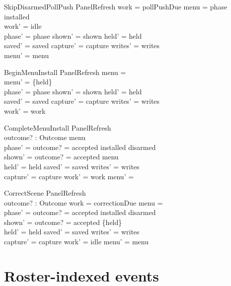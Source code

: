 \documentclass[a4paper,10pt,fleqn]{article}
\begin{document}
\begin{schema}{SkipDisarmedPollPush}
  \Delta PanelRefresh
\where
  work = pollPushDue \land menu = \emptyset \land phase \neq installed \\
  work' = idle \\
  phase' = phase \land shown' = shown \land held' = held \\
  saved' = saved \land capture' = capture \land writes' = writes \\
  menu' = menu
\end{schema}

\begin{schema}{BeginMenuInstall}
  \Delta PanelRefresh
\where
  menu = \emptyset \\
  menu' = \{held\} \\
  phase' = phase \land shown' = shown \land held' = held \\
  saved' = saved \land capture' = capture \land writes' = writes \\
  work' = work
\end{schema}

\begin{schema}{CompleteMenuInstall}
  \Delta PanelRefresh \\
  outcome? : Outcome
\where
  menu \neq \emptyset \\
  phase' = \IF outcome? = accepted \THEN installed \ELSE disarmed \\
  shown' = \IF outcome? = accepted \THEN menu \ELSE \emptyset \\
  held' = held \land saved' = saved \land writes' = writes \\
  capture' = capture \land work' = work \land menu' = \emptyset
\end{schema}

\begin{schema}{CorrectScene}
  \Delta PanelRefresh \\
  outcome? : Outcome
\where
  work = correctionDue \land menu = \emptyset \\
  phase' = \IF outcome? = accepted \THEN installed \ELSE disarmed \\
  shown' = \IF outcome? = accepted \THEN \{held\} \ELSE \emptyset \\
  held' = held \land saved' = saved \land writes' = writes \\
  capture' = capture \land work' = idle \land menu' = menu
\end{schema}

\section{Roster-indexed events}
\end{document}
